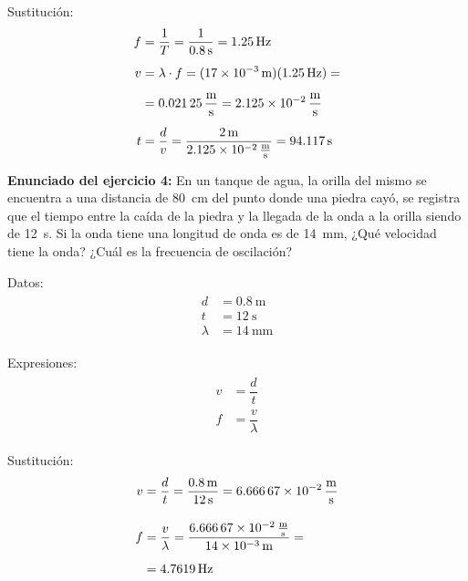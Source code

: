 \documentclass[12pt, letter]{article}
\begin{document}
Sustitución:
\begin{eqnarray*}
\begin{aligned}
f &= \dfrac{1}{T} = \dfrac{1}{\SI{0.8}{\second}} =  \SI{1.25}{\hertz} \\[0.5em] 
v &= \lambda \cdot f =  (\SI{17d-3}{\meter})(\SI{1.25}{\hertz}) = \\[0.5em] 
&= \SI[per-mode=fraction]{0.02125}{\meter\per\second} =  \SI[per-mode=fraction]{2.125d-2}{\meter\per\second} \\[0.5em] 
t &= \dfrac{d}{v} =  \dfrac{\SI{2}{\meter}}{\SI[per-mode=fraction]{2.125d-2}{\meter\per\second}} =  \SI{94.117}{\second}
\end{aligned}
\end{eqnarray*}

\textbf{Enunciado del ejercicio 4: } En un tanque de agua, la orilla del mismo se encuentra a una distancia de \SI{80}{\centi\meter} del punto donde una piedra cayó, se registra que el tiempo entre la caída de la piedra y la llegada de la onda a la orilla siendo de \SI{12}{\second}. Si la onda tiene una longitud de onda es de \SI{14}{\milli\meter}, ¿Qué velocidad tiene la onda? ¿Cuál es la frecuencia de oscilación?


Datos:
\begin{eqnarray*}
\begin{aligned}
d &= \SI{0.8}{\meter} \\[0.5em] 
t &= \SI{12}{\second} \\[0.5em] 
\lambda &= \SI{14}{\milli\meter}
\end{aligned}
\end{eqnarray*}

Expresiones:
\begin{eqnarray*}
\begin{aligned}
v &= \dfrac{d}{t} \\[0.5em] 
f &= \dfrac{v}{\lambda}
\end{aligned}
\end{eqnarray*}

Sustitución:
\begin{eqnarray*}
\begin{aligned}
v &= \dfrac{d}{t} =  \dfrac{\SI{0.8}{\meter}}{\SI{12}{\second}} =  \SI[per-mode=fraction]{6.66667d-2}{\meter\per\second} \\[1em] 
f &= \dfrac{v}{\lambda} =  \dfrac{\SI[per-mode=fraction]{6.66667d-2}{\meter\per\second}}{\SI{14d-3}{\meter}} = \\[0.5em] 
&= \SI{4.7619}{\hertz}
\end{aligned}
\end{eqnarray*}
\end{document}
